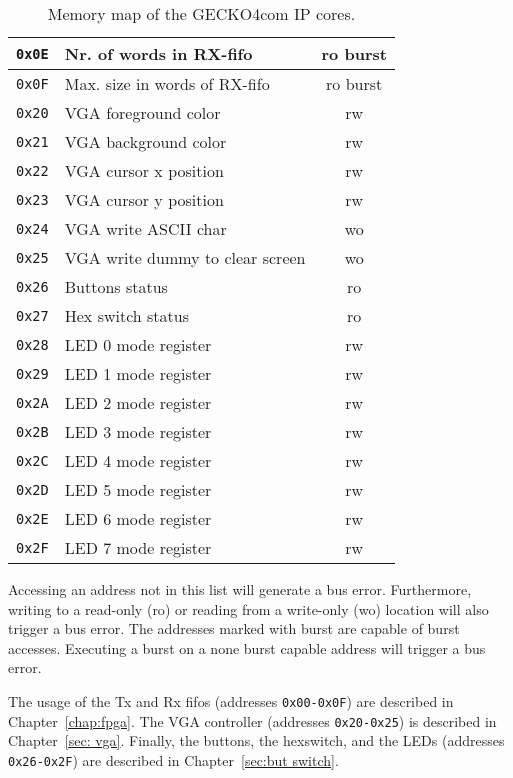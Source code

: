 \begin{table}[hp]
\begin{tabular}{|c|l|c|}
\verb+0x0E+&Nr. of words in RX-fifo&{\sc ro} {\sc burst}\\
\hline
\verb+0x0F+&Max. size in words of RX-fifo&{\sc ro} {\sc burst}\\
\hline
\verb+0x20+&VGA foreground color&{\sc rw}\\
\hline
\verb+0x21+&VGA background color&{\sc rw}\\
\hline
\verb+0x22+&VGA cursor x position&{\sc rw}\\
\hline
\verb+0x23+&VGA cursor y position&{\sc rw}\\
\hline
\verb+0x24+&VGA write ASCII char&{\sc wo}\\
\hline
\verb+0x25+&VGA write dummy to clear screen&{\sc wo}\\
\hline
\verb+0x26+&Buttons status&{\sc ro}\\
\hline
\verb+0x27+&Hex switch status&{\sc ro}\\
\hline
\verb+0x28+&LED 0 mode register&{\sc rw}\\
\hline
\verb+0x29+&LED 1 mode register&{\sc rw}\\
\hline
\verb+0x2A+&LED 2 mode register&{\sc rw}\\
\hline
\verb+0x2B+&LED 3 mode register&{\sc rw}\\
\hline
\verb+0x2C+&LED 4 mode register&{\sc rw}\\
\hline
\verb+0x2D+&LED 5 mode register&{\sc rw}\\
\hline
\verb+0x2E+&LED 6 mode register&{\sc rw}\\
\hline
\verb+0x2F+&LED 7 mode register&{\sc rw}\\
\hline
\end{tabular}
\caption{Memory map of the {\sc GECKO4com} IP cores.}
\label{tab:gecko4 memory map}
\end{table}
Accessing an address not in
this list will generate a bus error. Furthermore, writing to a read-only
({\sc ro}) or reading from a write-only ({\sc wo}) location will also trigger a bus
error. The addresses marked with {\sc burst} are capable of burst accesses.
Executing a burst on a none burst capable address will trigger a bus error.

The usage of the Tx and Rx fifos (addresses \verb+0x00-0x0F+) are described in
Chapter~\ref{chap:fpga}. The VGA controller (addresses \verb+0x20-0x25+) is described
in Chapter~\ref{sec: vga}. Finally, the buttons, the hexswitch, and the LEDs 
(addresses \verb+0x26-0x2F+) are described in Chapter~\ref{sec:but switch}.
